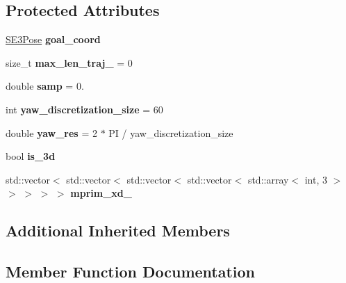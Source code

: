 \subsection*{Protected Attributes}
\begin{DoxyCompactItemize}
\item 
\mbox{\label{classnx_1_1SE2Environment_ab0c0d3623fa001720fec80fe973e551c}} 
\hyperlink{structnx_1_1SE3Pose}{S\+E3\+Pose} {\bfseries goal\+\_\+coord}
\item 
\mbox{\label{classnx_1_1SE2Environment_ae28b4b651b5b2b0f00862951083a84e6}} 
size\+\_\+t {\bfseries max\+\_\+len\+\_\+traj\+\_\+} = 0
\item 
\mbox{\label{classnx_1_1SE2Environment_a987e1a74480013e9c7187aee9fc25820}} 
double {\bfseries samp} = 0.
\item 
\mbox{\label{classnx_1_1SE2Environment_a02e5b4637072bf60e4bb24fda092d166}} 
int {\bfseries yaw\+\_\+discretization\+\_\+size} = 60
\item 
\mbox{\label{classnx_1_1SE2Environment_a452850e27e78085d661707f72c72497a}} 
double {\bfseries yaw\+\_\+res} = 2 $\ast$ PI / yaw\+\_\+discretization\+\_\+size
\item 
\mbox{\label{classnx_1_1SE2Environment_a197d1b81123220efcc2b51bc7928f467}} 
bool {\bfseries is\+\_\+3d}
\item 
\mbox{\label{classnx_1_1SE2Environment_a7941f5dec4704d105ce5084ce759d430}} 
std\+::vector$<$ std\+::vector$<$ std\+::vector$<$ std\+::vector$<$ std\+::array$<$ int, 3 $>$ $>$ $>$ $>$ $>$ {\bfseries mprim\+\_\+xd\+\_\+}
\end{DoxyCompactItemize}
\subsection*{Additional Inherited Members}


\subsection{Member Function Documentation}
\mbox{\label{classnx_1_1SE2Environment_ac9453c2a57e53c9f511eb04aabaa0809}} 
